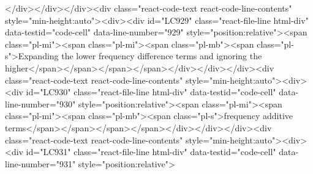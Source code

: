 {{{{{{{{{</div></div></div><div class="react-code-text react-code-line-contents" style="min-height:auto"><div><div id="LC929" class="react-file-line html-div" data-testid="code-cell" data-line-number="929" style="position:relative"><span class="pl-mi"><span class="pl-mi"><span class="pl-mb"><span class="pl-s">Expanding the lower frequency difference terms and ignoring the higher</span></span></span></span></div></div></div><div class="react-code-text react-code-line-contents" style="min-height:auto"><div><div id="LC930" class="react-file-line html-div" data-testid="code-cell" data-line-number="930" style="position:relative"><span class="pl-mi"><span class="pl-mi"><span class="pl-mb"><span class="pl-s">frequency additive terms</span></span></span></span></div></div></div><div class="react-code-text react-code-line-contents" style="min-height:auto"><div><div id="LC931" class="react-file-line html-div" data-testid="code-cell" data-line-number="931" style="position:relative">
}}}}}}}}}
